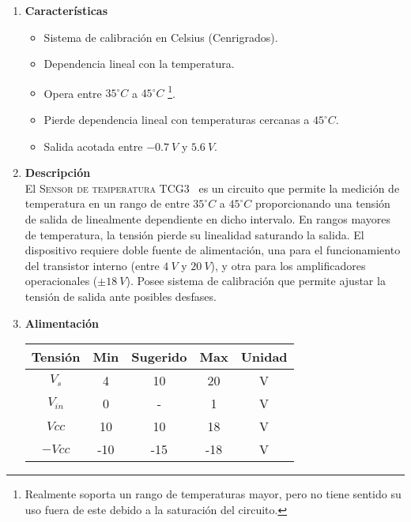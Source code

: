 \documentclass[a4paper]{article}
\begin{document}

\begin{enumerate}
	\item[1] \textbf{Características}
	\begin{itemize}
		\item Sistema de calibración en Celsius (Cenrigrados).
		\item Dependencia lineal con la temperatura.
		\item Opera entre $35^{\circ}C$ a $45^{\circ}C$ \footnote{Realmente soporta un rango de temperaturas mayor, pero no tiene sentido su uso fuera de este debido a la saturación del circuito.}.
		\item Pierde dependencia lineal con temperaturas cercanas a $45^{\circ}C$.
		\item Salida acotada entre $-0.7 \ V$ y $5.6 \ V$.
	\end{itemize}
	
	\item[2] \textbf{Descripción}\\
		El \textsc{Sensor de temperatura TCG3~\textsuperscript{\textregistered}} es un circuito que permite la medición de temperatura en un rango de entre $35^{\circ}C$ a $45^{\circ}C$ proporcionando una tensión de salida de linealmente dependiente en dicho intervalo. En rangos mayores de temperatura, la tensión pierde su linealidad saturando la salida. El dispositivo requiere doble fuente de alimentación, una para el funcionamiento del transistor interno (entre $4 \ V$ y $20 \ V$), y otra para los amplificadores operacionales ($\pm 18 \ V$). Posee sistema de calibración que permite ajustar la tensión de salida ante posibles desfases.
	
	\item[3] \textbf{Alimentación}\\
	\begin{table}[H]
		\begin{tabular}{ccccc}
			\hline
			Tensión & Min & Sugerido & Max & Unidad \\
			\hline
			$V_s$       & 4   	& 10       & 20  	& V \\
			$V_{in}$    & 0 	& -		   & 1	 	& V \\
			$Vcc$       & 10  	& 10       & 18 	& V \\
			$-Vcc$      & -10 	& -15      & -18 	& V	\\
			\hline
		\end{tabular}
	\end{table}
		

\end{enumerate}
\end{document}
